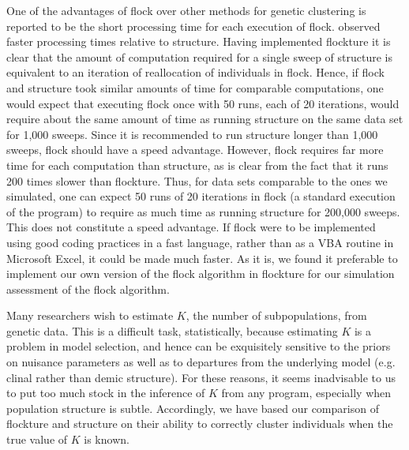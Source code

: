 One of the advantages of {\sc flock} over other methods for genetic clustering
is reported to be the short processing time for each execution of {\sc flock}.
\citet{Duc&Tur2012} observed faster processing times relative to {\sc structure}.
Having implemented {\sc flockture} it is clear that the amount of computation required for a
single sweep of {\sc structure} is equivalent to an iteration of reallocation of individuals
in {\sc flock}.
Hence, if {\sc flock} and {\sc structure} took similar amounts of time for comparable
computations, one would expect that executing {\sc flock} once with 50 runs, each of 20 iterations,
would require about the same amount of time as running {\sc structure} on the same
data set for 1,000 sweeps.  Since it is recommended to run {\sc structure} longer than 1,000 sweeps, {\sc flock} should have a speed advantage. However, {\sc flock} requires far more 
time for each computation
than {\sc structure}, as is clear from the fact that it runs 200 times slower than 
{\sc flockture}.  Thus, for data sets comparable to the ones we simulated, one can expect
50 runs of 20 iterations in {\sc flock} (a standard execution of the program) to require as
much time as running {\sc structure} for 200,000 sweeps. This does not constitute
a speed advantage.
If {\sc flock} were to be implemented using good coding practices in a fast language,
rather than as a VBA routine in Microsoft Excel,
it could be made much faster. As it is, we found it preferable to implement our own version
of the {\sc flock} algorithm
in {\sc flockture} for our simulation assessment of the {\sc flock} algorithm.


Many researchers wish to estimate $K$, the number of subpopulations, from genetic data.  This is
a difficult task, statistically, because estimating $K$ is a problem in model selection, and hence can
be exquisitely sensitive to the priors on nuisance parameters as well as to departures from the underlying
model (e.g. clinal rather than demic structure). For these reasons, it seems inadvisable to us to
put too much stock in the inference of $K$ from any program, especially when population structure
is subtle. Accordingly, we have based our comparison of 
{\sc flockture} and {\sc structure} on their ability to correctly cluster individuals when the true value
of $K$ is known. 


